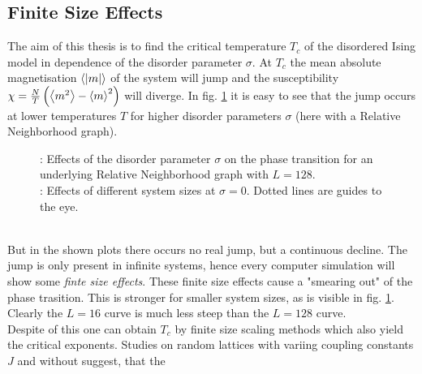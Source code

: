 \subsection{Finite Size Effects}
\label{ssec:finitesize}
    The aim of this thesis is to find the critical temperature \(T_c\)
    of the disordered Ising model in dependence of the disorder parameter
    \(\sigma\). At \(T_c\) the mean absolute magnetisation \(\left< |m| \right>\) of
    the system will jump and the susceptibility
    \(\chi = \frac{N}{T}\left(\left< m^2 \right>-\left< m \right>^2\right)\)
    will diverge. In fig. \ref{fig:smeared_out}
    it is easy to see that the jump occurs at lower temperatures \(T\) for higher
    disorder parameters \(\sigma\) (here with a Relative Neighborhood graph).
    \begin{figure}[htbp]
        \centering
        \caption[Phase Transition and Finite Size Effects]
        {
            : Effects of the disorder
            parameter $\sigma$ on the phase transition
            for an underlying Relative Neighborhood graph with $L=128$.\\
            : Effects of different system
            sizes at \(\sigma = 0\). Dotted lines are guides to the eye.
        }
        \label{fig:smeared_out}
    \end{figure}\\
    But in the shown plots there occurs no real jump, but a continuous
    decline. The jump is only present in infinite systems, hence every
    computer simulation will show some \emph{finte size effects}.
    These finite size effects cause a "smearing out" of the phase
    trasition. This is stronger for smaller system sizes, as is visible
    in fig. \ref{fig:smeared_out}. Clearly
    the \(L=16\) curve is much less steep than the \(L=128\) curve.\\
    Despite of this one can obtain \(T_c\) by finite size scaling
    methods \cite[S. ??]{NewmanBarkema1999} which also yield the critical
    exponents.
    Studies on random lattices with variing coupling constants \(J\)
    \cite{Lima2000} and without \cite{Janke1994} suggest, that the
